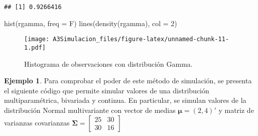 \documentclass[
  12pt,
  spanish,
]{book}
\newenvironment{Shaded}{\begin{snugshade}}{\end{snugshade}}
\newcommand{\AttributeTok}[1]{\textcolor[rgb]{0.77,0.63,0.00}{#1}}
\newcommand{\DecValTok}[1]{\textcolor[rgb]{0.00,0.00,0.81}{#1}}
\newcommand{\FunctionTok}[1]{\textcolor[rgb]{0.00,0.00,0.00}{#1}}
\newcommand{\NormalTok}[1]{#1}
\theoremstyle{definition}
\theoremstyle{definition}
\newtheorem{example}{Ejemplo}[chapter]
\theoremstyle{definition}
\theoremstyle{definition}
\theoremstyle{remark}
\begin{document}
\begin{verbatim}
## [1] 0.9266416
\end{verbatim}

\begin{Shaded}
\begin{Highlighting}[]
\FunctionTok{hist}\NormalTok{(rgamma, }\AttributeTok{freq =}\NormalTok{ F)}
\FunctionTok{lines}\NormalTok{(}\FunctionTok{density}\NormalTok{(rgamma), }\AttributeTok{col =} \DecValTok{2}\NormalTok{)}
\end{Highlighting}
\end{Shaded}

\begin{figure}
\centering
\texttt{[image: A3Simulacion\_files/figure-latex/unnamed-chunk-11-1.pdf]}
\caption{\label{fig:unnamed-chunk-11}Histograma de observaciones con distribución Gamma.}
\end{figure}

\begin{example}
\protect\hypertarget{exm:unnamed-chunk-12}{}{\label{exm:unnamed-chunk-12} }Para comprobar el poder de este método de simulación, se presenta el siguiente código que permite simular valores de una distribución multiparamétrica, bivariada y continua. En particular, se simulan valores de la distribución Normal multivariante con vector de medias \(\boldsymbol \mu= (2, 4)'\) y matriz de varianzas covarianzas
\(\boldsymbol \Sigma= \begin{bmatrix} 25 & 30 \\ 30 & 16 \end{bmatrix}\)
\end{example}
\end{document}

